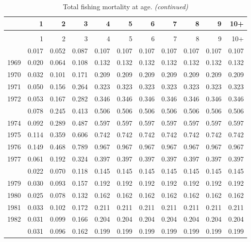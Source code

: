\documentclass[
]{article}
\begin{document}
\begin{longtable}[t]{lrrrrrrrrrr}
\caption{\label{tab:FAA-tot-table}Total fishing mortality at age.}\\
\toprule
  & 1 & 2 & 3 & 4 & 5 & 6 & 7 & 8 & 9 & 10+\\
\midrule
\endfirsthead
\caption[]{Total fishing mortality at age. \textit{(continued)}}\\
\toprule
  & 1 & 2 & 3 & 4 & 5 & 6 & 7 & 8 & 9 & 10+\\
\midrule
\endhead

\endfoot
\bottomrule
\endlastfoot
1968 & 0.017 & 0.052 & 0.087 & 0.107 & 0.107 & 0.107 & 0.107 & 0.107 & 0.107 & 0.107\\
1969 & 0.020 & 0.064 & 0.108 & 0.132 & 0.132 & 0.132 & 0.132 & 0.132 & 0.132 & 0.132\\
1970 & 0.032 & 0.101 & 0.171 & 0.209 & 0.209 & 0.209 & 0.209 & 0.209 & 0.209 & 0.209\\
1971 & 0.050 & 0.156 & 0.264 & 0.323 & 0.323 & 0.323 & 0.323 & 0.323 & 0.323 & 0.323\\
1972 & 0.053 & 0.167 & 0.282 & 0.346 & 0.346 & 0.346 & 0.346 & 0.346 & 0.346 & 0.346\\
\addlinespace
1973 & 0.078 & 0.245 & 0.413 & 0.506 & 0.506 & 0.506 & 0.506 & 0.506 & 0.506 & 0.506\\
1974 & 0.092 & 0.289 & 0.487 & 0.597 & 0.597 & 0.597 & 0.597 & 0.597 & 0.597 & 0.597\\
1975 & 0.114 & 0.359 & 0.606 & 0.742 & 0.742 & 0.742 & 0.742 & 0.742 & 0.742 & 0.742\\
1976 & 0.149 & 0.468 & 0.789 & 0.967 & 0.967 & 0.967 & 0.967 & 0.967 & 0.967 & 0.967\\
1977 & 0.061 & 0.192 & 0.324 & 0.397 & 0.397 & 0.397 & 0.397 & 0.397 & 0.397 & 0.397\\
\addlinespace
1978 & 0.022 & 0.070 & 0.118 & 0.145 & 0.145 & 0.145 & 0.145 & 0.145 & 0.145 & 0.145\\
1979 & 0.030 & 0.093 & 0.157 & 0.192 & 0.192 & 0.192 & 0.192 & 0.192 & 0.192 & 0.192\\
1980 & 0.025 & 0.078 & 0.132 & 0.162 & 0.162 & 0.162 & 0.162 & 0.162 & 0.162 & 0.162\\
1981 & 0.033 & 0.102 & 0.172 & 0.211 & 0.211 & 0.211 & 0.211 & 0.211 & 0.211 & 0.211\\
1982 & 0.031 & 0.099 & 0.166 & 0.204 & 0.204 & 0.204 & 0.204 & 0.204 & 0.204 & 0.204\\
\addlinespace
1983 & 0.031 & 0.096 & 0.162 & 0.199 & 0.199 & 0.199 & 0.199 & 0.199 & 0.199 & 0.199\\

\end{longtable}
\end{document}
